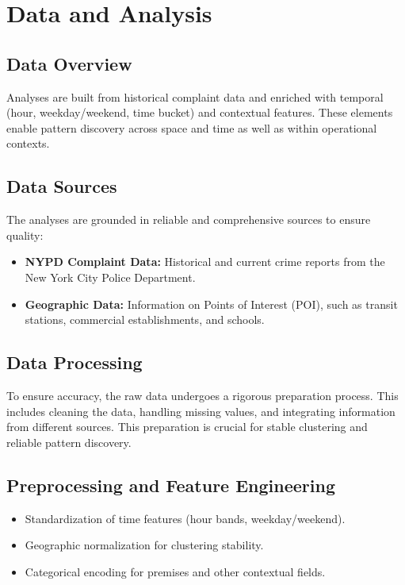 \documentclass[11pt]{article}
\begin{document}
\section{Data and Analysis}

\subsection{Data Overview}
Analyses are built from historical complaint data and enriched with temporal (hour, weekday/weekend, time bucket) and contextual features. These elements enable pattern discovery across space and time as well as within operational contexts.

\subsection{Data Sources}
The analyses are grounded in reliable and comprehensive sources to ensure quality:
\begin{itemize}[leftmargin=*]
  \item \textbf{NYPD Complaint Data:} Historical and current crime reports from the New York City Police Department.
  \item \textbf{Geographic Data:} Information on Points of Interest (POI), such as transit stations, commercial establishments, and schools.
\end{itemize}

\subsection{Data Processing}
To ensure accuracy, the raw data undergoes a rigorous preparation process. This includes cleaning the data, handling missing values, and integrating information from different sources. This preparation is crucial for stable clustering and reliable pattern discovery.

\subsection{Preprocessing and Feature Engineering}
\begin{itemize}[leftmargin=*]
  \item Standardization of time features (hour bands, weekday/weekend).
  \item Geographic normalization for clustering stability.
  \item Categorical encoding for premises and other contextual fields.
\end{itemize}
\end{document}
